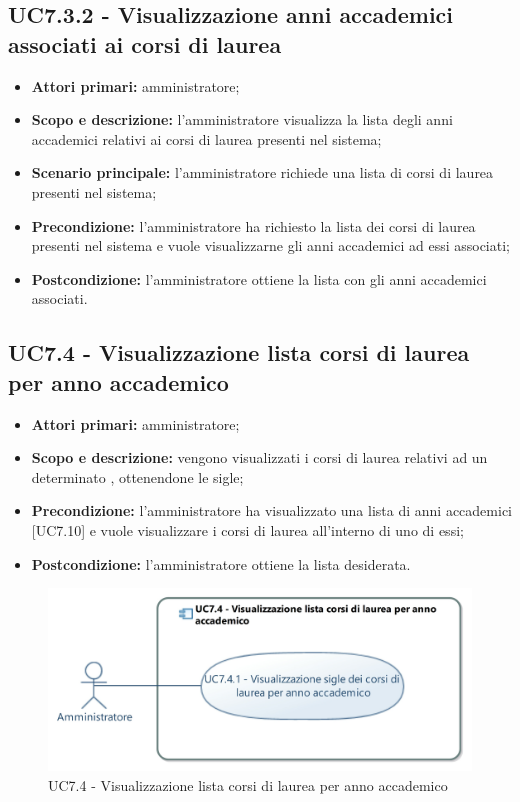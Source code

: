 \documentclass[AnalisiDeiRequisiti.tex]{subfiles}
\begin{document}
\subsection{UC7.3.2 - Visualizzazione anni accademici associati ai corsi di laurea}
\begin{itemize}
	\item \textbf{Attori primari:} amministratore;
	\item \textbf{Scopo e descrizione:} l'amministratore visualizza la lista degli anni accademici relativi ai corsi di laurea presenti nel sistema;
	\item \textbf{Scenario principale:} l'amministratore richiede una lista di corsi di laurea presenti nel sistema;
	\item \textbf{Precondizione:} l'amministratore ha richiesto la lista dei corsi di laurea presenti nel sistema e vuole visualizzarne gli anni accademici ad essi associati; 
	\item \textbf{Postcondizione:} l'amministratore ottiene la lista con gli anni accademici associati.
\end{itemize}
\subsection{UC7.4 - Visualizzazione lista corsi di laurea per anno accademico}
\begin{itemize}
	\item \textbf{Attori primari:} amministratore;
	\item \textbf{Scopo e descrizione:} vengono visualizzati i corsi di laurea relativi ad un determinato , ottenendone le sigle;
	\item \textbf{Precondizione:} l'amministratore ha visualizzato una lista di anni accademici [UC7.10] e vuole visualizzare i corsi di laurea all'interno di uno di essi; 
	\item \textbf{Postcondizione:} l'amministratore ottiene la lista desiderata.
\end{itemize}
\begin{figure}[H]
	\centering
	\includegraphics[width=0.7\linewidth]{UC7_4.jpg}
	\caption{UC7.4 - Visualizzazione lista corsi di laurea per anno accademico}
	\label{fig:UC7.4 - Visualizzazione lista corsi di laurea per anno accademico}
\end{figure}
\end{document}
